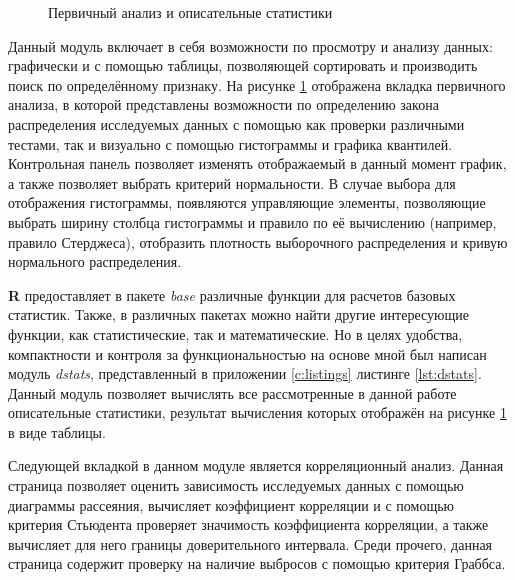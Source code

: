 \begin{figure}[ht]
\caption{Первичный анализ и описательные статистики}
\label{img:mod_basis}
\end{figure}
Данный модуль включает в себя возможности по просмотру и анализу данных: графически и с помощью таблицы, позволяющей сортировать и производить поиск по определённому признаку. На рисунке \ref{img:mod_basis} отображена вкладка первичного анализа, в которой представлены возможности по определению закона распределения исследуемых данных с помощью как проверки различными тестами, так и визуально с помощью гистограммы и графика квантилей. Контрольная панель позволяет изменять отображаемый в данный момент график, а также позволяет выбрать критерий нормальности. В случае выбора для отображения гистограммы, появляются управляющие элементы, позволяющие выбрать ширину столбца гистограммы и правило по её вычислению (например, правило Стерджеса), отобразить плотность выборочного распределения и кривую нормального распределения.

\textbf{R} предоставляет в пакете \textit{base} различные функции для расчетов базовых статистик. Также, в различных пакетах можно найти другие интересующие функции, как статистические, так и математические. Но в целях удобства, компактности и контроля за функциональностью на основе \cite{Eliseeva1995, Cramer1997} мной был написан модуль \textit{dstats}, представленный в приложении \ref{c:listings} листинге \ref{lst:dstats}. Данный модуль позволяет вычислять все рассмотренные в данной работе описательные статистики, результат вычисления которых отображён на рисунке \ref{img:mod_basis} в виде таблицы.

Следующей вкладкой в данном модуле является корреляционный анализ. Данная страница позволяет оценить зависимость исследуемых данных с помощью диаграммы рассеяния, вычисляет коэффициент корреляции и с помощью критерия Стьюдента проверяет значимость коэффициента корреляции, а также вычисляет для него границы доверительного интервала. Среди прочего, данная страница содержит проверку на наличие выбросов с помощью критерия Граббса.

